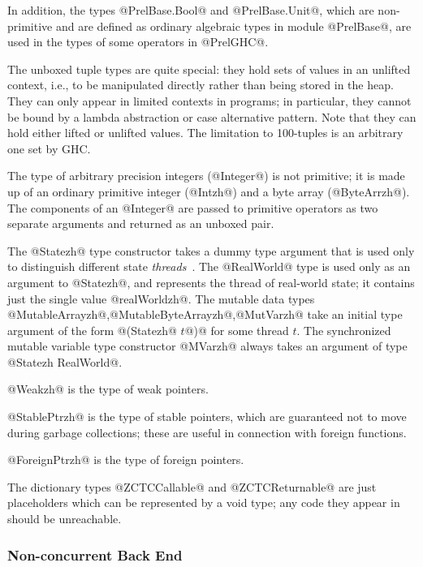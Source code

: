 \documentclass[10pt]{article}
\begin{document}
In addition, the types @PrelBase.Bool@ and @PrelBase.Unit@, which are non-primitive
and are defined as ordinary algebraic types in module @PrelBase@, are used in
the types of some operators in @PrelGHC@.

The unboxed tuple types are quite special: they hold sets of values in an unlifted
context, i.e., to be manipulated directly rather than being stored in the heap.  They can only
appear in limited contexts in programs; in particular, they cannot be bound by a
lambda abstraction or case alternative pattern. Note that they can hold either lifted
or unlifted values.  The limitation to 100-tuples is an arbitrary one set by GHC.

The type of arbitrary precision integers (@Integer@) is not primitive; it is made
up of an ordinary primitive integer (@Intzh@) and a byte array (@ByteArrzh@).
The components of an @Integer@ are passed to primitive operators as two separate
arguments and returned as an unboxed pair.

The @Statezh@ type constructor takes a dummy type argument that is used only 
to distinguish different state {\it threads}~\cite{Launchbury94}.
The @RealWorld@ type is used only as an argument to @Statezh@, and represents
the thread of real-world state; it contains just the single value @realWorldzh@.
The mutable data types @MutableArrayzh@,@MutableByteArrayzh@,@MutVarzh@
take an initial type argument of the form @(Statezh@ $t$@)@ for some thread $t$.
The synchronized mutable variable type constructor @MVarzh@ always takes an argument of type
@Statezh RealWorld@.

@Weakzh@ is the type of weak pointers.

@StablePtrzh@ is the type of stable pointers, which are guaranteed not to move
during garbage collections; these are useful in connection with foreign functions.

@ForeignPtrzh@ is the type of foreign pointers.

The dictionary types @ZCTCCallable@ and @ZCTCReturnable@ are just placeholders
which can be represented by a void type;
any code they appear in should be unreachable.

\subsubsection{Non-concurrent Back End}
\label{sec:sequential}
\end{document}
